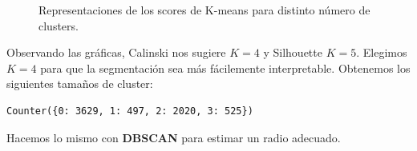 \documentclass[oneside]{book}
\begin{document}
\begin{figure}[H]
  \centering
  \caption{Representaciones de los scores de K-means para distinto número de clusters.}
  \label{fig:k-means22-scores}
\end{figure}

Observando las gráficas, Calinski nos sugiere $K=4$ y Silhouette
$K=5$. Elegimos $K=4$ para que la segmentación sea más fácilemente
interpretable. Obtenemos los siguientes tamaños de cluster:
\begin{verbatim}
Counter({0: 3629, 1: 497, 2: 2020, 3: 525})
\end{verbatim}

Hacemos lo mismo con \textbf{DBSCAN} para estimar un radio adecuado.
\end{document}
